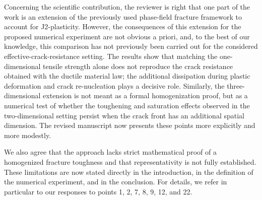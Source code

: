 \documentclass[pdflatex,sn-mathphys-num]{sn-jnl}
\begin{document}
Concerning the scientific contribution, the reviewer is right that one part of the work is an extension of the previously used phase-field fracture framework to account for J2-plasticity. However, the consequences of this extension for the proposed numerical experiment are not obvious a priori, and, to the best of our knowledge, this comparison has not previously been carried out for the considered effective-crack-resistance setting. The results show that matching the one-dimensional tensile strength alone does not reproduce the crack resistance obtained with the ductile material law; the additional dissipation during plastic deformation and crack re-nucleation plays a decisive role. Similarly, the three-dimensional extension is not meant as a formal homogenization proof, but as a numerical test of whether the toughening and saturation effects observed in the two-dimensional setting persist when the crack front has an additional spatial dimension. The revised manuscript now presents these points more explicitly and more modestly.

We also agree that the approach lacks strict mathematical proof of a homogenized fracture toughness and that representativity is not fully established. These limitations are now stated directly in the introduction, in the definition of the numerical experiment, and in the conclusion. For details, we refer in particular to our responses to points 1, 2, 7, 8, 9, 12, and 22.
\end{document}
